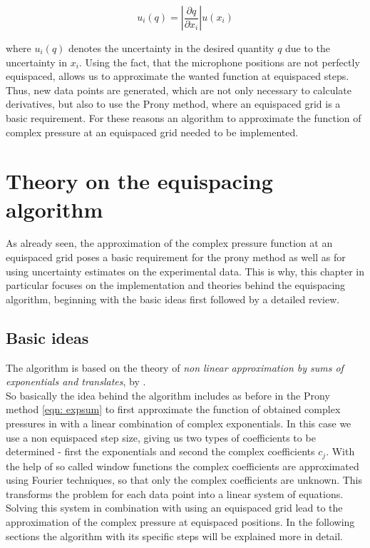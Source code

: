 \documentclass[11pt]{report} %
\begin{document}
\begin{equation}
u_{i}(q)= \left\vert \frac{\partial q}{\partial x_{i}} \right\vert u( x_{i})
\end{equation}

where $u_{i}(q)$ denotes the uncertainty in the desired quantity $q$ due to the uncertainty in $x_{i}$.
Using the fact, that the microphone positions are not perfectly equispaced, allows us to approximate the wanted function at equispaced steps.
Thus, new data points are generated, which are not only necessary to calculate derivatives, but also to use the Prony method, where an equispaced grid is a basic requirement.
For these reasons an algorithm to approximate the function of complex pressure at an equispaced grid needed to be implemented. 
  
\chapter{Theory on the equispacing algorithm} 
\label{chap:EquispaceTheory}
As already seen, the approximation of the complex pressure function at an equispaced grid poses a basic requirement for the prony method as well as for using uncertainty estimates on the experimental data.
This is why, this chapter in particular focuses on the implementation and theories behind the equispacing algorithm, beginning with the basic ideas first followed by a detailed review. 

\section{Basic ideas}
The algorithm is based on the theory of \textit{non linear approximation by sums of exponentials and translates}, by \cite{Peter2011}.\\
So basically the idea behind the algorithm includes as before in the Prony method \eqref{eqn: expsum} to first approximate the function of obtained complex pressures in with a linear combination of complex exponentials.
In this case we use a non equispaced step size, giving us two types of coefficients to be determined - first the exponentials and second the complex coefficients $c_j$. 
With the help of so called window functions the complex coefficients are approximated using Fourier techniques, so that only the complex coefficients are unknown. 
This transforms the problem for each data point into a linear system of equations.
Solving this system in combination with using an equispaced grid lead to the approximation of the complex pressure at equispaced positions.
In the following sections the algorithm with its specific steps will be explained more in detail. 
\end{document}
